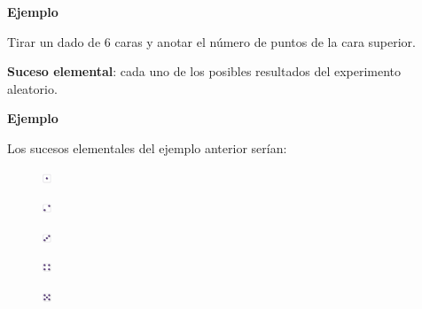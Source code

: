 \documentclass[
  letterpaper,
  DIV=11,
  numbers=noendperiod]{scrreprt}
\begin{document}
\textbf{Ejemplo}

Tirar un dado de 6 caras y anotar el número de puntos de la cara
superior.

\textbf{Suceso elemental}: cada uno de los posibles resultados del
experimento aleatorio.

\textbf{Ejemplo}

Los sucesos elementales del ejemplo anterior serían:

\begin{figure}

{\centering \includegraphics[width=0.1in,height=\textheight]{Images/proba1dibujos/dice/1.png}

}

\end{figure}

\begin{figure}

{\centering \includegraphics[width=0.1in,height=\textheight]{Images/proba1dibujos/dice/2.png}

}

\end{figure}

\begin{figure}

{\centering \includegraphics[width=0.1in,height=\textheight]{Images/proba1dibujos/dice/3.png}

}

\end{figure}

\begin{figure}

{\centering \includegraphics[width=0.1in,height=\textheight]{Images/proba1dibujos/dice/4.png}

}

\end{figure}

\begin{figure}

{\centering \includegraphics[width=0.1in,height=\textheight]{Images/proba1dibujos/dice/5.png}

}

\end{figure}
\end{document}
